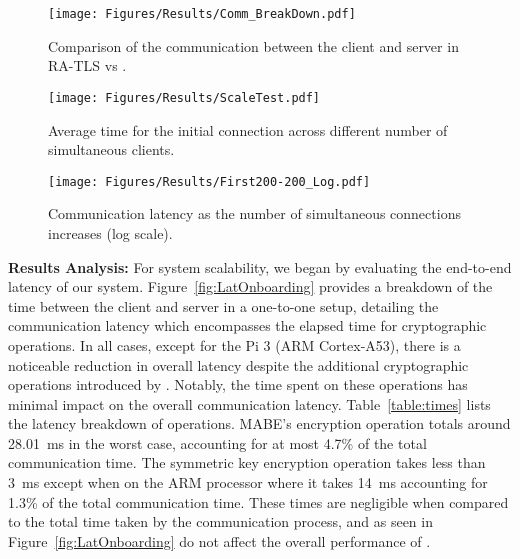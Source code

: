 \begin{figure*}[ht]
\centering
    \begin{minipage}[t]{0.3\textwidth}
        \centering
        \texttt{[image: Figures/Results/Comm\_BreakDown.pdf]}
        \vspace{-0.3in}
        \caption{Comparison of the communication between the client and server in RA-TLS vs \sysname.} 
        \label{fig:LatOnboarding}
    \end{minipage}%
    \hspace{0.02\textwidth}
    \begin{minipage}[t]{0.3\textwidth}
        \centering
        \texttt{[image: Figures/Results/ScaleTest.pdf]}  
        \vspace{-0.3in}
        \caption{Average time for the initial connection across different number of simultaneous clients.}
        \label{fig:ScaleTest}
    \end{minipage}%
    \hspace{0.02\textwidth}
    \begin{minipage}[t]{0.3\textwidth}
        \centering
        \texttt{[image: Figures/Results/First200-200\_Log.pdf]}  
        \vspace{-0.3in}
         \caption{Communication latency as the number of simultaneous connections increases (log scale).}  
        \label{fig:First1000}
    \end{minipage}
    \vspace{-0.1in}
\end{figure*}

\noindent
{\bf Results Analysis:} For system scalability, we began by evaluating the end-to-end latency of our system. Figure~\ref{fig:LatOnboarding} provides a breakdown of the time between the client and server in a one-to-one setup, detailing the communication latency which encompasses the elapsed time for cryptographic operations. 
In all cases, except for the Pi 3 (ARM Cortex-A53), there is a noticeable reduction in overall latency despite the additional cryptographic operations introduced by \sysname. Notably, the time spent on these operations has minimal impact on the overall communication latency. Table~\ref{table:times} lists the latency breakdown of \sysname operations. {\color{black} MABE's encryption operation totals around 28.01~ms in the worst case, accounting for at most 4.7\% of the total communication time. The symmetric key encryption operation takes less than 3~ms except when on the ARM processor where it takes 14~ms accounting for 1.3\% of the total communication time.} These times are negligible when compared to the total time taken by the communication process, and as seen in Figure~\ref{fig:LatOnboarding} do not affect the overall performance of \sysname.

